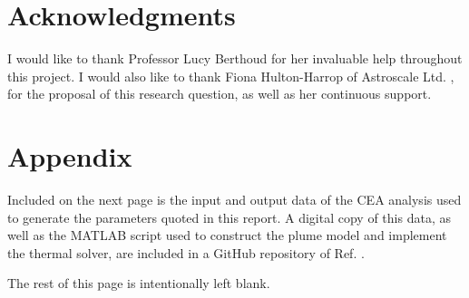 \documentclass[journal]{new-aiaa}
\begin{document}
\label{Section_Conclusion}





\section*{Acknowledgments}

I would like to thank Professor Lucy Berthoud for her invaluable help throughout this project. I would also like to thank Fiona Hulton-Harrop of Astroscale Ltd. , for the proposal of this research question, as well as her continuous support.




%





\newpage
\section*{Appendix}
\renewcommand{\thetable}{A\arabic{table}}
\renewcommand{\thefigure}{A\arabic{figure}}
\renewcommand{\theequation}{A\arabic{equation}}
\setcounter{table}{0}
\setcounter{figure}{0}
\setcounter{equation}{0}

Included on the next page is the input and output data of the CEA analysis used to generate the parameters quoted in this report. A digital copy of this data, as well as the MATLAB script used to construct the plume model and implement the thermal solver, are included in a GitHub repository of Ref.
\cite{GeneralJacobHigginsRP42025}.

The rest of this page is intentionally left blank.
\end{document}
